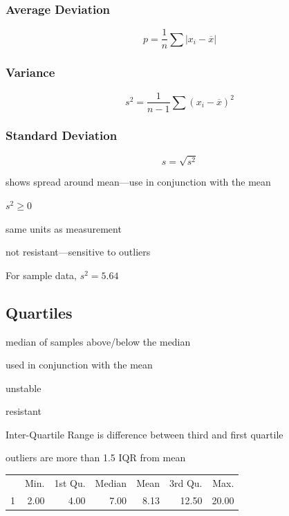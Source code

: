 \documentclass{exam}
\newcommand*\mean[1]{\overline{#1}}
\begin{document}
  \subsubsection{Average Deviation}
  \[
    p = \frac{1}{n} \sum |x_i - \mean{x}|
  \]

  \subsubsection{Variance}
  \[
    s^2 = \frac{1}{n - 1} \sum ( x_i - \mean{x} )^2
  \]

  \subsubsection{Standard Deviation}
  \[
    s = \sqrt{s^2}
  \]

  \begin{itemize*}
    \item shows spread around mean---use in conjunction with the mean
    \item $s^2 \geq 0$
    \item same units as measurement
    \item not resistant---sensitive to outliers
  \end{itemize*}

  For sample data, $s^2 = 5.64$

  \subsection{Quartiles}

  \begin{itemize*}
    \item median of samples above/below the median
    \item used in conjunction with the mean
    \item unstable
    \item resistant
    \item Inter-Quartile Range is difference between third and first quartile
    \item outliers are more than 1.5 IQR from mean
  \end{itemize*}

  \begin{table}[ht]
    \centering
    \begin{tabular}{rrrrrrr}
      \toprule
      \midrule
        & Min. & 1st Qu. & Median & Mean & 3rd Qu. & Max. \\
      1 & 2.00 & 4.00    & 7.00   & 8.13 & 12.50   & 20.00 \\
      \bottomrule
    \end{tabular}
  \end{table}
\end{document}
